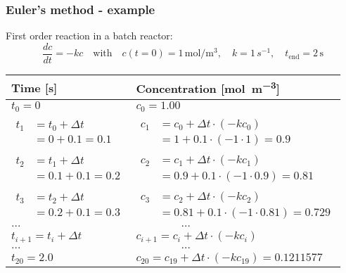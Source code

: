 \documentclass[11pt,table,final,fleqn,xcolor={usenames,dvipsnames,table}]{beamer}
\begin{document}
\begin{frame}
  \frametitle{Euler's method - example}
  First order reaction in a batch reactor:
  \[
    \frac{dc}{dt} = -kc \quad \text{with} \quad c(t=0) = 1\, \si{\mole\per\cubic\meter}, \quad k = 1\, \si{s^{-1}}, \quad t_\text{end} = 2\, \si{\second}
  \]
  \pause
  \footnotesize\selectfont
  \begin{longtable}{p{}p{}}
  \hline
    Time [\si{\second}] & Concentration [\si{\mole\per\cubic\meter}] \\ \hline
    $t_0 = 0$                                 & $c_0 = 1.00$ \\
    $\begin{aligned}t_1 &= t_0 + \Delta t\\ &= 0 + 0.1 = 0.1\end{aligned}$    & $\begin{aligned}c_1 &= c_0 + \Delta t \cdot (-kc_0) \\ &= 1 + 0.1 \cdot (-1 \cdot 1) = 0.9\end{aligned}$ \\
    $\begin{aligned}t_2 &= t_1 + \Delta t\\ &= 0.1 + 0.1 = 0.2\end{aligned}$  & $\begin{aligned}c_2 &= c_1 + \Delta t \cdot (-kc_1)\\ &= 0.9 + 0.1 \cdot (-1 \cdot 0.9) = 0.81\end{aligned}$ \\ 
    $\begin{aligned} t_3 &= t_2 + \Delta t \\ &= 0.2 + 0.1 = 0.3\end{aligned}$  & $\begin{aligned}c_3 &= c_2 + \Delta t \cdot (-kc_2)\\ &= 0.81 + 0.1 \cdot (-1 \cdot 0.81) = 0.729 \end{aligned}$ \\ 
    \centering$\ldots$                                  & $\quad \quad \quad \quad \ldots$ \\
    $t_{i+1} = t_i + \Delta t$                & $c_{i+1} = c_i + \Delta t \cdot (-k c_i) $ \\
    \centering$\ldots$ & $\quad \quad \quad \quad \ldots$ \\
    $t_{20} = 2.0 $ & $c_{20} = c_{19} + \Delta t \cdot (-k c_{19}) = 0.1211577$ \\
    \hline
  \end{longtable}
\end{frame}
\end{document}
